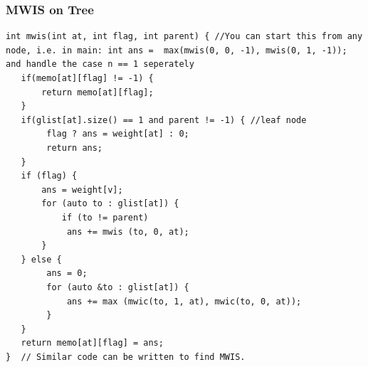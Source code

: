 \documentclass[8pt, a4paper, oneside, twocolumn]{extarticle}
\begin{document}
\subsubsection{MWIS on Tree}
\begin{verbatim}
int mwis(int at, int flag, int parent) { //You can start this from any node, i.e. in main: int ans =  max(mwis(0, 0, -1), mwis(0, 1, -1)); and handle the case n == 1 seperately
   if(memo[at][flag] != -1) {
       return memo[at][flag];
   }
   if(glist[at].size() == 1 and parent != -1) { //leaf node
        flag ? ans = weight[at] : 0;
        return ans;
   }
   if (flag) {
       ans = weight[v];
       for (auto to : glist[at]) {
           if (to != parent)
            ans += mwis (to, 0, at);
       }
   } else {
        ans = 0;
        for (auto &to : glist[at]) {
            ans += max (mwic(to, 1, at), mwic(to, 0, at));
        }
   }
   return memo[at][flag] = ans;
}  // Similar code can be written to find MWIS.
\end{verbatim}
\end{document}
